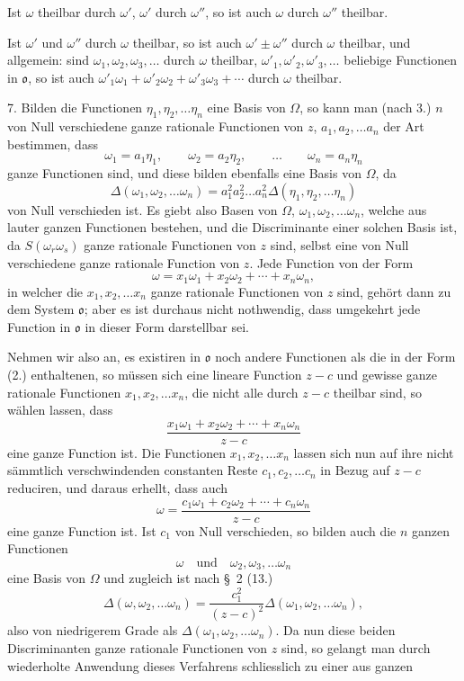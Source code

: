 \documentclass{article}
\begin{document}
Ist $\omega$ theilbar durch $\omega'$, $\omega'$ durch $\omega''$, so ist auch $\omega$ durch $\omega''$ theilbar.

Ist $\omega'$ und $\omega''$ durch $\omega$ theilbar, so ist auch $\omega' \pm \omega''$ durch $\omega$ theilbar, und allgemein: sind $\omega_{1}, \omega_{2}, \omega_{3}, \ldots$ durch $\omega$ theilbar, $\omega'_{1}, \omega'_{2}, \omega'_{3}, \ldots$ beliebige Functionen in $\mathfrak{o}$, so ist auch $\omega'_{1}\omega_{1} + \omega'_{2}\omega_{2} + \omega'_{3}\omega_{3} + \cdots$ durch $\omega$ theilbar.


7. Bilden die Functionen $\eta_{1}, \eta_{2}, \ldots \eta_{n}$ eine Basis von $\Omega$, so kann man (nach 3.) $n$ von Null verschiedene ganze rationale Functionen von $z$, $a_{1}, a_{2}, \ldots a_{n}$ der Art bestimmen, dass
\[ \omega_{1} = a_{1}\eta_{1}, \qquad \omega_{2} = a_{2}\eta_{2}, \qquad \ldots \qquad \omega_{n} = a_{n}\eta_{n} \]
ganze Functionen sind, und diese bilden ebenfalls eine Basis von $\Omega$, da
\[ \Delta(\omega_{1}, \omega_{2}, \ldots \omega_{n}) = a_{1}^{2}a_{2}^{2}\ldots a_{n}^{2}\Delta(\eta_{1}, \eta_{2}, \ldots \eta_{n}) \]
von Null verschieden ist. Es giebt also Basen von $\Omega$, $\omega_{1}, \omega_{2}, \ldots \omega_{n}$, welche aus lauter ganzen Functionen bestehen, und die Discriminante einer solchen Basis ist, da $S(\omega_{r}\omega_{s})$ ganze rationale Functionen von $z$ sind, selbst eine von Null verschiedene ganze rationale Function von $z$. Jede Function von der Form
\[ \omega = x_{1}\omega_{1} + x_{2}\omega_{2} + \cdots + x_{n}\omega_{n}, \tag{2.} \]
in welcher die $x_{1}, x_{2}, \ldots x_{n}$ ganze rationale Functionen von $z$ sind, gehört dann zu dem System $\mathfrak{o}$; aber es ist durchaus nicht nothwendig, dass umgekehrt jede Function in $\mathfrak{o}$ in dieser Form darstellbar sei.

Nehmen wir also an, es existiren in $\mathfrak{o}$ noch andere Functionen als die in der Form (2.) enthaltenen, so müssen sich eine lineare Function $z-c$ und gewisse ganze rationale Functionen $x_{1}, x_{2}, \ldots x_{n}$, die nicht alle durch $z-c$ theilbar sind, so wählen lassen, dass
\[ \frac{x_{1}\omega_{1} + x_{2}\omega_{2} + \cdots + x_{n}\omega_{n}}{z-c} \]
eine ganze Function ist. Die Functionen $x_{1}, x_{2}, \ldots x_{n}$ lassen sich nun auf ihre nicht sämmtlich verschwindenden constanten Reste $c_{1}, c_{2}, \ldots c_{n}$ in Bezug auf $z-c$ reduciren, und daraus erhellt, dass auch
\[ \omega = \frac{c_{1}\omega_{1} + c_{2}\omega_{2} + \cdots + c_{n}\omega_{n}}{z-c} \]
eine ganze Function ist. Ist $c_{1}$ von Null verschieden, so bilden auch die $n$ ganzen Functionen
\[ \omega \quad \text{und} \quad \omega_{2}, \omega_{3}, \ldots \omega_{n} \]
eine Basis von $\Omega$ und zugleich ist nach §~2 (13.)
\[ \Delta(\omega, \omega_{2}, \ldots \omega_{n}) = \frac{c_{1}^{2}}{(z-c)^{2}}\Delta(\omega_{1}, \omega_{2}, \ldots \omega_{n}), \]
also von niedrigerem Grade als $\Delta(\omega_{1}, \omega_{2}, \ldots \omega_{n})$. Da nun diese beiden Discriminanten ganze rationale Functionen von $z$ sind, so gelangt man durch wiederholte Anwendung dieses Verfahrens schliesslich zu einer aus ganzen
\end{document}
